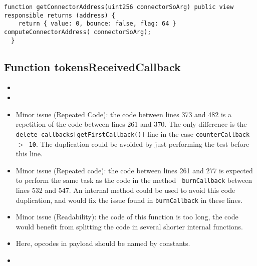 \begin{lstlisting}[firstnumber=108]
  function getConnectorAddress(uint256 connectorSoArg) public view responsible returns (address) {
    return { value: 0, bounce: false, flag: 64 } computeConnectorAddress( connectorSoArg);
  }
\end{lstlisting}

\subsection{Function tokensReceivedCallback}

\begin{itemize}
\item {}
\item {}
\item Minor issue (Repeated Code): the code between lines 373 and 482
  is a repetition of the code between lines 261 and 370. The only
  difference is the {\tt delete callbacks[getFirstCallback()]} line in
  the case {\tt counterCallback $>$ 10}. The duplication could be
  avoided by just performing the test before this line.
\item Minor issue (Repeated code): the code between lines 261 and 277
  is expected to perform the same task as the code in the method {\tt
    burnCallback} between lines 532 and 547. An internal method could
  be used to avoid this code duplication, and would fix the issue
  found in {\tt burnCallback} in these lines.
\item Minor issue (Readability): the code of this function is too
  long, the code would benefit from splitting the code in several
  shorter internal functions.
\item \issueNumber{} Here, opcodes in payload should be named by
  constants.
\item \issueEncodeBody{}
\end{itemize}

